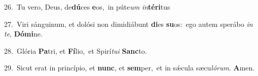 {\numbfont\textcolor{\numbcolor}{26.}}~Tu vero, Deus, de\-\textbf{dú}\-ces \textbf{e}\-os,~\star in púte\textit{um} \textit{in}\-\textbf{tér}\textbf{i}tus\par
{\numbfont\textcolor{\numbcolor}{27.}}~Viri sánguinum, et dolósi non dimidiábunt \textbf{di}\-es \textbf{su}\-os:~\star ego autem sperábo \textit{in} \textit{te}\-, \textbf{Dó}\-\textbf{mi}ne.\par
{\numbfont\textcolor{\numbcolor}{28.}}~Glória \textbf{Pa}\-tri, et \textbf{Fí}\-lio,~\star et Spirí\-\textit{tu}\-\textit{i} \textbf{Sanc}\-to.\par
{\numbfont\textcolor{\numbcolor}{29.}}~Sicut erat in princípio, et \textbf{nunc}\-, et \textbf{sem}\-per,~\star et in sǽcula sæcu\-\textit{ló}\-\textit{rum}. \textbf{A}\-men.\par

